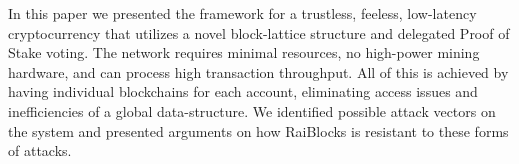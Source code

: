 In this paper we presented the framework for a trustless, feeless, low-latency cryptocurrency that utilizes a novel block-lattice structure and delegated Proof of Stake voting. The network requires minimal resources, no high-power mining hardware, and can process high transaction throughput. All of this is achieved by having individual blockchains for each account, eliminating access issues and inefficiencies of a global data-structure. We identified possible attack vectors on the system and presented arguments on how RaiBlocks is resistant to these forms of attacks.